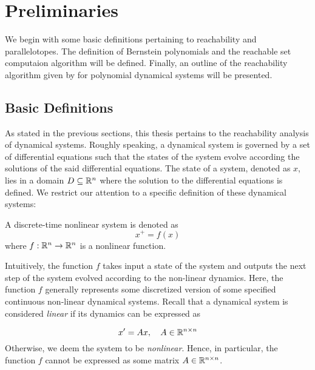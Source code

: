 \chapter{Preliminaries}
\label{chap:prelim}

We begin with some basic definitions pertaining to reachability and parallelotopes. The definition of Bernstein polynomials and the reachable set computaion algorithm will be defined. Finally, an outline of the reachability algorithm given by \cite{dreossi2016parallelotope} for polynomial dynamical systems will be presented.

\section{Basic Definitions}
\label{sec:definitions}

As stated in the previous sections, this thesis pertains to the reachability analysis of dynamical systems. Roughly speaking, a dynamical system is governed by a set of differential equations such that the states of the system evolve according the solutions of the said differential equations.
%
The state of a system, denoted as $x$, lies in a domain $D \subseteq {\mathbb{R}}^n$ where the solution to the differential equations is defined.
%
We restrict our attention to a specific definition of these dynamical systems:
%
\begin{definition}
A discrete-time nonlinear system is denoted as
\begin{equation}
  x^{+} = f(x)
\label{eq:sys}
\end{equation}
where $f: {\mathbb{R}}^{n} \rightarrow {\mathbb{R}}^{n}$ is a nonlinear function.
\end{definition}
%
 Intuitively, the function $f$ takes input a state of the system and outputs the next step of the system evolved according to the non-linear dynamics.
%
Here, the function $f$ generally represents some discretized version of some specified continuous non-linear dynamical systems. Recall that a dynamical system is considered \emph{linear} if its dynamics can be expressed as

$$
x' = Ax, \quad A \in {\mathbb{R}}^{n \times n}
$$
%
Otherwise, we deem the system to be \emph{nonlinear}.
%
Hence, in particular, the function $f$ cannot be expressed as some matrix $A \in {\mathbb{R}}^{n \times n}$.

